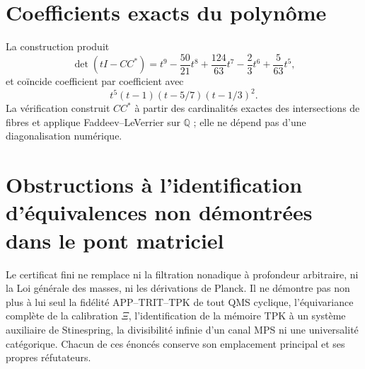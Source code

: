 \section{Coefficients exacts du polynôme}

La construction produit
\[
 \det(tI-CC^*)
 =t^9-\frac{50}{21}t^8+\frac{124}{63}t^7
  -\frac23t^6+\frac5{63}t^5,
 \tag{GMC-A.1}
\]
et coïncide coefficient par coefficient avec
\[
 t^5(t-1)(t-5/7)(t-1/3)^2.
 \tag{GMC-A.2}
\]
La vérification construit \(CC^*\) à partir des cardinalités exactes des
intersections de fibres et applique Faddeev--LeVerrier sur \(\mathbb Q\) ; elle ne
dépend pas d'une diagonalisation numérique.

\section{Obstructions à l'identification d'équivalences non démontrées dans le pont matriciel}

Le certificat fini ne remplace ni la filtration nonadique à profondeur arbitraire, ni la
Loi générale des masses, ni les dérivations de Planck. Il ne démontre pas non plus à lui
seul la fidélité APP--TRIT--TPK de tout QMS cyclique, l'équivariance complète
de la calibration \(\Xi\), l'identification de la mémoire TPK à un système
auxiliaire de Stinespring, la divisibilité infinie d'un canal MPS ni une
universalité catégorique. Chacun de ces énoncés conserve son emplacement
principal et ses propres réfutateurs.
